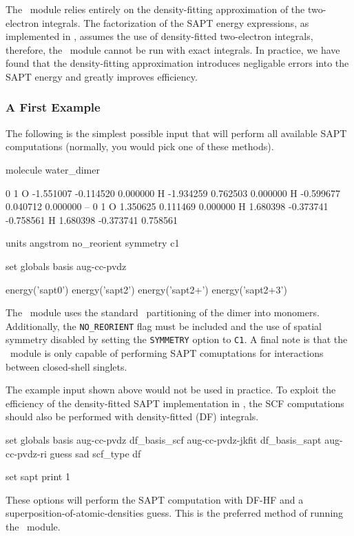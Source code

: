 The \PSIsapt\ module relies entirely on the density-fitting approximation
of the two-electron integrals. The factorization of the SAPT energy
expressions, as implemented in \PSIfour, assumes the use of density-fitted
two-electron integrals, therefore, the \PSIsapt\ module cannot be run with
exact integrals. In practice, we have found that the density-fitting
approximation introduces negligable errors into the SAPT energy and greatly
improves efficiency. 

\subsubsection{A First Example}

The following is the simplest possible input that will perform all
available SAPT computations (normally, you would pick one of these methods).
\begin{Snippet}

molecule water_dimer {
     0 1
     O  -1.551007  -0.114520   0.000000
     H  -1.934259   0.762503   0.000000
     H  -0.599677   0.040712   0.000000
     --
     0 1
     O   1.350625   0.111469   0.000000
     H   1.680398  -0.373741  -0.758561
     H   1.680398  -0.373741   0.758561

     units angstrom
     no_reorient
     symmetry c1
}

set globals {
    basis         aug-cc-pvdz
}

energy('sapt0')
energy('sapt2')
energy('sapt2+')
energy('sapt2+3')

\end{Snippet}
The \PSIsapt\ module uses the standard \PSIfour\ partitioning of the dimer
into monomers. Additionally, the \texttt{NO\_REORIENT} flag must be included
and the use of spatial symmetry disabled by setting the \texttt{SYMMETRY}
option to \texttt{C1}. A final note is that the \PSIsapt\ module is only 
capable of performing SAPT comuptations for interactions between closed-shell 
singlets. 

The example input shown above would not be used in practice.
To exploit the efficiency of the density-fitted SAPT implementation in
\PSIfour, the SCF computations should also be performed with density-fitted
(DF) integrals.
\begin{Snippet}

set globals {
    basis         aug-cc-pvdz
    df_basis_scf  aug-cc-pvdz-jkfit
    df_basis_sapt aug-cc-pvdz-ri
    guess         sad
    scf_type      df
}

set sapt {
    print         1
}

\end{Snippet}
These options will perform the SAPT computation with DF-HF and a 
superposition-of-atomic-densities guess. This is the preferred method of 
running the \PSIsapt\ module.

